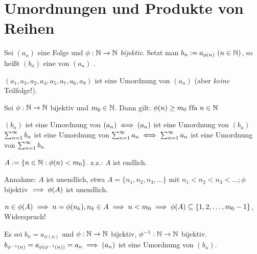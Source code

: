 \documentclass[a4paper,twoside,DIV15,BCOR12mm]{scrbook}
\begin{document}
\chapter{Umordnungen und Produkte von Reihen}

\begin{definition}[Umordnung]
Sei $(a_n)$ eine Folge und $\phi: \mathbb{N} \to \mathbb{N}$ \emph{bijektiv}. Setzt man $b_n:=a_{\phi(n)}\ (n\in\mathbb{N})$, so heißt $(b_n)$  eine  von $(a_n)$ \alt{$\areihe$}.
\end{definition}

\begin{beispiel}
$(a_1,a_3,a_2,a_4,a_5,a_7,a_6,a_8)$ ist eine Umordnung von $(a_n)$ (aber \emph{keine} Teilfolge!).
\end{beispiel}

\begin{hilfssatz}
\begin{liste}
\item Sei $\phi: \mathbb{N} \to \mathbb{N}$ bijektiv und $m_0\in\mathbb{N}$. Dann gilt: $\phi(n) \ge m_0 \text{ f\/fa } n\in\mathbb{N}$
\item $(b_n)$ ist eine Umordnung von $(a_n) \iff (a_n)$ ist eine Umordnung von $(b_n)$ \\
$\sum_{n=1}^{\infty}{b_n}$ ist eine Umordnung von $\sum_{n=1}^{\infty}{a_n} \iff \sum_{n=1}^{\infty}{a_n}$ ist eine Umordnung von $\sum_{n=1}^{\infty}{b_n}$
\end{liste}
\end{hilfssatz}

\begin{beweise}
\item $A:=\{n\in\mathbb{N}: \phi(n)<m_0\}$. z.z.: $A$ ist endlich.

Annahme: $A$ ist unendlich, etwa $A=\{n_1,n_2,n_3,\ldots\}$ mit $n_1<n_2<n_3<\ldots; \phi$ bijektiv $\implies \phi(A)$ ist unendlich.

$n\in\phi(A) \implies n=\phi(n_k), n_k\in A \implies n<m_0 \implies \phi(A) \subseteq \{1,2,\ldots,m_0-1\}$, Widerspruch!

\item Es sei $b_n=a_{\phi(n)}$ und $\phi: \mathbb{N} \to \mathbb{N}$ bijektiv, $\phi^{-1}: \mathbb{N} \to \mathbb{N}$ bijektiv. $b_{\phi^{-1}(n)} = a_{\phi(\phi^{-1}(n))} = a_n \implies (a_n)$ ist eine Umordnung von $(b_n)$.
\end{beweise}
\end{document}
